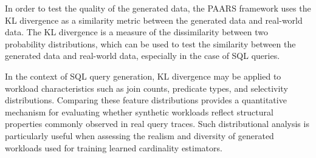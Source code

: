 In order to test the quality of the generated data, the PAARS framework uses the KL divergence as a similarity metric between the generated data and real-world data. The KL divergence is a measure of the dissimilarity between two probability distributions, which can be used to test the similarity between the generated data and real-world data, especially in the case of SQL queries\cite{DBLP:journals/corr/abs-2512-20271}.

In the context of SQL query generation, KL divergence may be applied to workload characteristics such as join counts, predicate types, and selectivity distributions. Comparing these feature distributions provides a quantitative mechanism for evaluating whether synthetic workloads reflect structural properties commonly observed in real query traces. Such distributional analysis is particularly useful when assessing the realism and diversity of generated workloads used for training learned cardinality estimators.